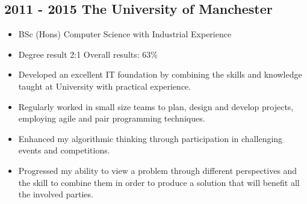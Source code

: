 \documentclass[12pt,a4paper]{res}
\begin{document}
\begin{resume}
\section{\bf 2011 - 2015 \hspace{1.5mm}The University of Manchester}
  
  \begin{itemize} %
     \item[] BSc (Hons) Computer Science  with Industrial Experience
     \item[] Degree result 2:1 \hspace{10mm}Overall results: 63\% 

     \item Developed an excellent IT foundation by combining the skills and knowledge taught
     at University with practical experience.
     \item Regularly worked in small size teams to plan, design and develop projects,   employing agile and pair programming techniques.
     \item Enhanced my algorithmic thinking through participation in challenging events and competitions.
     \item Progressed my ability to view a problem through different perspectives and the skill to combine them in order to produce a solution that will benefit all the involved parties.
   \end{itemize}


\end{resume}
\end{document}
